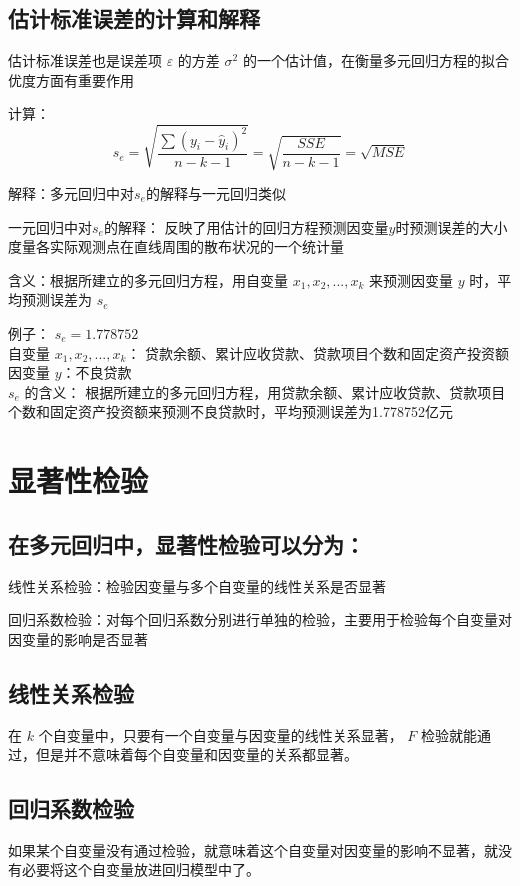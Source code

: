 \documentclass[UTF8,10pt]{book}
\begin{document}
\subsection{估计标准误差的计算和解释}	

估计标准误差也是误差项 $\varepsilon$ 的方差 $ \sigma^2 $ 的一个估计值，在衡量多元回归方程的拟合优度方面有重要作用 

计算： 
$$ s_{e}=\sqrt{\frac{\sum\left(y_{i}-\hat{y}_{i}\right)^{2}}{n-k-1}}=\sqrt{\frac{S S E}{n-k-1}}=\sqrt{M S E} $$ 

解释：多元回归中对$s_e$的解释与一元回归类似 

一元回归中对$s_e$的解释： 反映了用估计的回归方程预测因变量$y$时预测误差的大小度量各实际观测点在直线周围的散布状况的一个统计量 

含义：根据所建立的多元回归方程，用自变量 $x_1,x_2,...,x_k$ 来预测因变量 $y$ 时，平均预测误差为 $s_e$ 

例子： $s_e = 1.778752$ \\
自变量 $x_1,x_2,...,x_k$：
贷款余额、累计应收贷款、贷款项目个数和固定资产投资额 \\
因变量 $y$：不良贷款\\
 $s_e$ 的含义： 根据所建立的多元回归方程，用贷款余额、累计应收贷款、贷款项目个数和固定资产投资额来预测不良贷款时，平均预测误差为1.778752亿元

\section{显著性检验}
\subsection{在多元回归中，显著性检验可以分为：}	

线性关系检验：检验因变量与多个自变量的线性关系是否显著

回归系数检验：对每个回归系数分别进行单独的检验，主要用于检验每个自变量对因变量的影响是否显著

\subsection{线性关系检验}	在 $k$ 个自变量中，只要有一个自变量与因变量的线性关系显著， $F$ 检验就能通过，但是并不意味着每个自变量和因变量的关系都显著。

\subsection{回归系数检验}	如果某个自变量没有通过检验，就意味着这个自变量对因变量的影响不显著，就没有必要将这个自变量放进回归模型中了。
\end{document}
